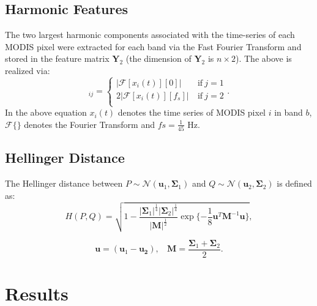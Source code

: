 \documentclass{article}
\begin{document}
\subsection{Harmonic Features}
\label{sec:fft}
The two largest harmonic components associated with the time-series of each MODIS pixel were extracted for each band via the Fast Fourier Transform and stored 
in the feature matrix $\mathbf{Y}_2$ (the dimension of $\mathbf{Y}_2$ is $n\times 2$). The above is realized via:
\begin{equation}
[\mathbf{Y}_2]_{ij} =
\begin{cases}
|\mathcal{F}[x_i(t)][0]|&~\textrm{if}~j=1\\
2|\mathcal{F}[x_i(t)][f_s]|&~\textrm{if}~j=2\\
\end{cases}.
\end{equation}
In the above equation $x_i(t)$ denotes the time series of MODIS pixel $i$ in band $b$, $\mathcal{F}\{\}$ denotes the Fourier Transform and $fs = \frac{1}{45}$ Hz.

\subsection{Hellinger Distance}
\label{sec:HD}
The Hellinger distance between $P\sim\mathcal{N}(\mathbf{u}_1,\mathbf{\Sigma}_1)$ and $Q\sim\mathcal{N}(\mathbf{u}_2,\mathbf{\Sigma}_2)$ is defined as:
\begin{equation}
\label{eq:HD}
H(P,Q) = \sqrt{1 - \frac{|\mathbf{\Sigma}_1|^{\frac{1}{4}}|\mathbf{\Sigma}_2|^{\frac{1}{4}}}{|\mathbf{M}|^{\frac{1}{2}}}\exp \{-\frac{1}{8}\mathbf{u}^T\mathbf{M}^{-1}\mathbf{u}\}},
\end{equation}

\begin{equation}
\mathbf{u} = (\mathbf{u}_1-\mathbf{u_2}),~~~~\mathbf{M} = \frac{\mathbf{\Sigma}_1 + \mathbf{\Sigma}_2}{2}. 
\end{equation}

\section{Results}
\end{document}
